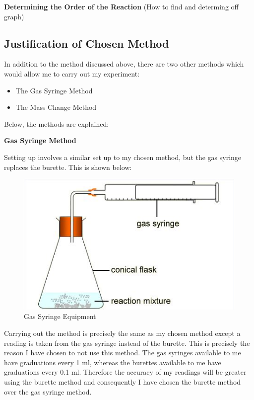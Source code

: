 \textbf{Determining the Order of the Reaction}
(How to find and determing off graph)










	\subsection{Justification of Chosen Method}

In addition to the method discussed above, there are two other methods which would allow me to carry out my experiment:
\begin{itemize}
\item The Gas Syringe Method
\item The Mass Change Method 
\end{itemize}

Below, the methods are explained:

\textbf{Gas Syringe Method}



Setting up involves a similar set up to my chosen method, but the gas syringe replaces the burette. This is shown below:
\begin{figure}[H]
    \includegraphics[width=\textwidth]{./Planning/Images/GasSyringe.jpg}
    \caption{Gas Syringe Equipment} \label{fig:Gas Syringe}
\end{figure}

Carrying out the method is precisely the same as my chosen method except a reading is taken from the gas syringe instead of the burette. This is precisely the reason I have chosen to not use this method. The gas syringes available to me have graduations every 1 ml, whereas the burettes available to me have graduations every 0.1 ml. Therefore the accuracy of my readings will be greater using the burette method and consequently I have chosen the burette method over the gas syringe method. 

